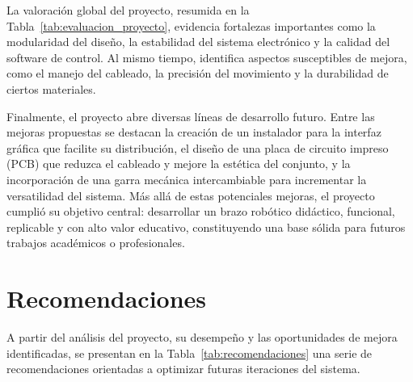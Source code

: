 La valoración global del proyecto, resumida en la Tabla~\ref{tab:evaluacion_proyecto}, evidencia fortalezas importantes como la modularidad del diseño, la estabilidad del sistema electrónico y la calidad del software de control. Al mismo tiempo, identifica aspectos susceptibles de mejora, como el manejo del cableado, la precisión del movimiento y la durabilidad de ciertos materiales.

\vspace{1em}

Finalmente, el proyecto abre diversas líneas de desarrollo futuro. Entre las mejoras propuestas se destacan la creación de un instalador para la interfaz gráfica que facilite su distribución, el diseño de una placa de circuito impreso (PCB) que reduzca el cableado y mejore la estética del conjunto, y la incorporación de una garra mecánica intercambiable para incrementar la versatilidad del sistema. Más allá de estas potenciales mejoras, el proyecto cumplió su objetivo central: desarrollar un brazo robótico didáctico, funcional, replicable y con alto valor educativo, constituyendo una base sólida para futuros trabajos académicos o profesionales.


\section{Recomendaciones}


A partir del análisis del proyecto, su desempeño y las oportunidades de mejora identificadas, se presentan en la Tabla~\ref{tab:recomendaciones} una serie de recomendaciones orientadas a optimizar futuras iteraciones del sistema.

